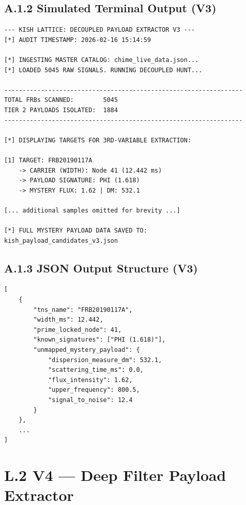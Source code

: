 \documentclass[11pt, letterpaper, openany]{book}
\begin{document}
\subsection*{A.1.2 Simulated Terminal Output (V3)}
\begin{lstlisting}[style=terminal]
--- KISH LATTICE: DECOUPLED PAYLOAD EXTRACTOR V3 ---
[*] AUDIT TIMESTAMP: 2026-02-16 15:14:59

[*] INGESTING MASTER CATALOG: chime_live_data.json...
[*] LOADED 5045 RAW SIGNALS. RUNNING DECOUPLED HUNT...

-----------------------------------------------------------------
TOTAL FRBs SCANNED:        5045
TIER 2 PAYLOADS ISOLATED:  1884
-----------------------------------------------------------------

[*] DISPLAYING TARGETS FOR 3RD-VARIABLE EXTRACTION:

[1] TARGET: FRB20190117A
    -> CARRIER (WIDTH): Node 41 (12.442 ms)
    -> PAYLOAD SIGNATURE: PHI (1.618)
    -> MYSTERY FLUX: 1.62 | DM: 532.1

[... additional samples omitted for brevity ...]

[*] FULL MYSTERY PAYLOAD DATA SAVED TO: kish_payload_candidates_v3.json
\end{lstlisting}

\subsection*{A.1.3 JSON Output Structure (V3)}
\begin{lstlisting}[style=terminal]
[
    {
        "tns_name": "FRB20190117A",
        "width_ms": 12.442,
        "prime_locked_node": 41,
        "known_signatures": ["PHI (1.618)"],
        "unmapped_mystery_payload": {
            "dispersion_measure_dm": 532.1,
            "scattering_time_ms": 0.0,
            "flux_intensity": 1.62,
            "upper_frequency": 800.5,
            "signal_to_noise": 12.4
        }
    },
    ...
]
\end{lstlisting}

\section*{L.2 V4 — Deep Filter Payload Extractor}
\end{document}
